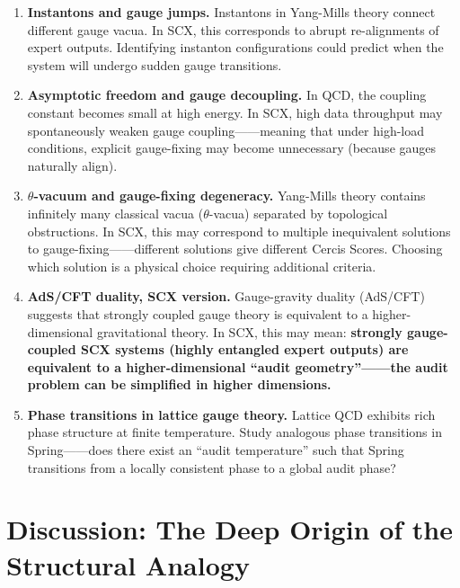 \documentclass[12pt,a4paper]{article}
\theoremstyle{remark}
\begin{document}
\begin{enumerate}[label=\textbf{Direction \arabic*:}]
    \item \textbf{Instantons and gauge jumps.} Instantons in Yang-Mills theory connect different gauge vacua.
    In SCX, this corresponds to abrupt re-alignments of expert outputs. Identifying instanton configurations could predict
    when the system will undergo sudden gauge transitions.

    \item \textbf{Asymptotic freedom and gauge decoupling.} In QCD, the coupling constant becomes small at high energy.
    In SCX, high data throughput may spontaneously weaken gauge coupling——meaning that under high-load
    conditions, explicit gauge-fixing may become unnecessary (because gauges naturally align).

    \item \textbf{$\theta$-vacuum and gauge-fixing degeneracy.} Yang-Mills theory contains infinitely many
    classical vacua ($\theta$-vacua) separated by topological obstructions. In SCX, this may correspond to
    multiple inequivalent solutions to gauge-fixing——different solutions give different Cercis Scores.
    Choosing which solution is a physical choice requiring additional criteria.

    \item \textbf{AdS/CFT duality, SCX version.} Gauge-gravity duality (AdS/CFT) suggests
    that strongly coupled gauge theory is equivalent to a higher-dimensional gravitational theory. In SCX, this may mean:
    \textbf{strongly gauge-coupled SCX systems (highly entangled expert outputs) are equivalent to a
    higher-dimensional ``audit geometry''——the audit problem can be simplified in higher dimensions.}

    \item \textbf{Phase transitions in lattice gauge theory.} Lattice QCD exhibits rich phase structure at finite temperature.
    Study analogous phase transitions in Spring——does there exist an ``audit temperature''
    such that Spring transitions from a locally consistent phase to a global audit phase?
\end{enumerate}

\newpage

\section{Discussion: The Deep Origin of the Structural Analogy}
\end{document}
